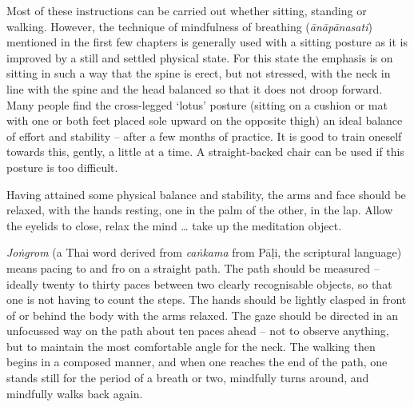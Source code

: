 
Most of these instructions can be carried out whether sitting, standing or walking. However, the technique of mindfulness of breathing (\textit{\=an\=ap\=anasati}) mentioned in the first few chapters is generally used with a sitting posture as it is improved by a still and settled physical state. For this state the emphasis is on sitting in such a way that the spine is erect, but not stressed, with the neck in line with the spine and the head balanced so that it does not droop forward. Many people find the cross-legged `lotus' posture (sitting on a cushion or mat with one or both feet placed sole upward on the opposite thigh) an ideal balance of effort and stability -- after a few months of practice. It is good to train oneself towards this, gently, a little at a time. A straight-backed chair can be used if this posture is too difficult. 

Having attained some physical balance and stability, the arms and face should be relaxed, with the hands resting, one in the palm of the other, in the lap. Allow the eyelids to close, relax the mind \ldots{} take up the meditation object.

\textit{Jo\.ngrom} (a Thai word derived from \textit{ca\.nkama} from P\=a\d{l}i, the scriptural language) means pacing to and fro on a straight path. The path should be measured -- ideally twenty to thirty paces between two clearly recognisable objects, so that one is not having to count the steps. The hands should be lightly clasped in front of or behind the body with the arms relaxed. The gaze should be directed in an unfocussed way on the path about ten paces ahead -- not to observe anything, but to maintain the most comfortable angle for the neck. The walking then begins in a composed manner, and when one reaches the end of the path, one stands still for the period of a breath or two, mindfully turns around, and mindfully walks back again.


